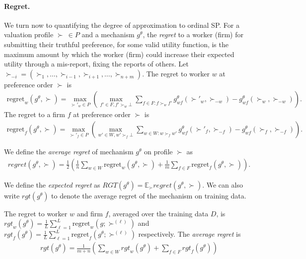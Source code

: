 \documentclass[11pt,letterpaper]{article}
\theoremstyle{definition}
\newcommand{\kibitz}[2]{\ifnum\Comments=1{\color{#1}{#2}}\fi}
\newcommand{\zf}[1]{\kibitz{blue}{[ZF: #1]}}
\begin{document}
\paragraph{Regret.}
We turn now to quantifying the degree of 
approximation to ordinal SP.
For a valuation profile $\succ \ \in P$ and a mechanism $g^\theta$, the {\em regret} to a worker (firm) for submitting their truthful preference, for some valid utility function,  is the maximum amount by which the worker (firm) could increase their expected utility through a mis-report, fixing the reports of others.
%
Let $\succ_{-i}=(\succ_1,\ldots,\succ_{i-1},\succ_{i+1},\ldots,\succ_{n + m})$.
%
%
The regret to worker $w$ at preference order $\succ$ is 
\begin{eqnarray}\label{eq:regret-worker}
\mathrm{regret}_w(g^\theta, \succ) = \max_{\succ'_{w} \in P} \left( \max_{f' \in F, f' \succ_{w} \bot} \sum_{f\in F: f\succ_w f'} g^\theta_{wf}(\succ'_w, \succ_{-w}) -  g^\theta_{wf}(\succ_w, \succ_{-w})\right).
\end{eqnarray}
%
The regret to a firm $f$ at preference order $\succ$ is
%
\begin{eqnarray}\label{eq:regret-firm}
\mathrm{regret}_f(g^\theta, \succ) =  \max_{\succ'_{f} \in P} \left( \max_{w' \in W, w' \succ_{f} \bot} \sum_{w\in W: w\succ_f w'} g^\theta_{wf}(\succ'_f, \succ_{-f}) -  g^\theta_{wf}(\succ_f, \succ_{-f}) \right). 
\end{eqnarray}

We  define the {\em average regret } of mechanism $g^\theta$ on profile $\succ$ as
%
\begin{align}
\mathit{regret}(g^\theta,\succ)=\frac{1}{2}\left(\frac{1}{n}\sum_{w\in W}\mathrm{regret}_w(g^\theta, \succ)+ \frac{1}{m}\sum_{f\in F} \mathrm{regret}_f(g^\theta, \succ) \right).
\end{align}

We  define the {\em  expected regret } as $\mathit{RGT}(g^\theta)=\mathbb{E}_\succ \mathit{regret}(g^\theta,\succ)$. We can also write $\mathit{rgt}(g^\theta)$ to denote the average regret of the mechanism on training data.
%


The regret to worker $w$ and firm $f$,  averaged over the training data $D$, is  $\mathit{rgt}_w(g^\theta) = \frac{1}{L} \sum_{\ell = 1}^{L} \mathrm{regret}_w (g; \succ^{(\ell)})$ and $\mathit{rgt}_f(g^\theta) = \frac{1}{L} \sum_{\ell = 1}^{L} \mathrm{regret}_f (g^\theta; \succ^{(\ell)})$ respectively.
 The {\em  average regret} is
 \begin{align}
     \mathit{rgt}(g^\theta)= \frac{1}{m+n} \left(\sum_{w \in W} \mathit{rgt}_w(g^\theta) + \sum_{f \in F} \mathit{rgt}_f(g^\theta)\right)
     \end{align}
     \fi
\end{document}
